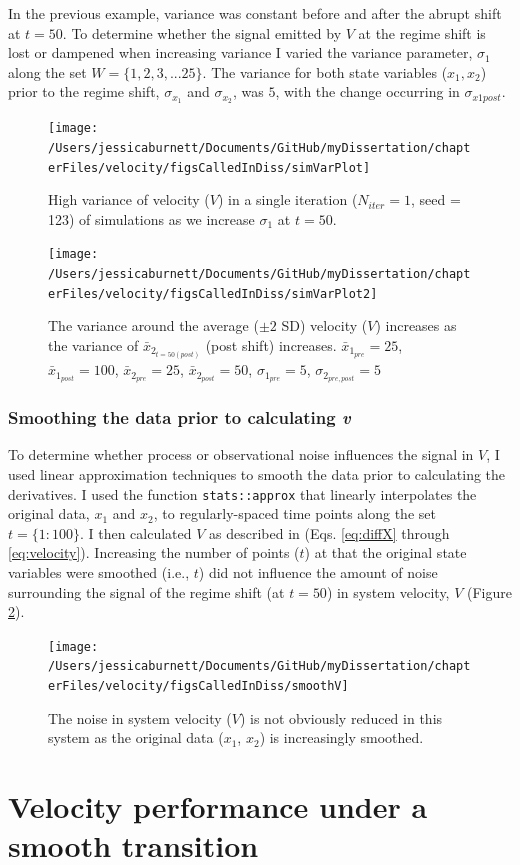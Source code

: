 \documentclass[12pt,twoside,openany]{reedthesis}
\begin{document}
In the previous example, variance was constant before and after the abrupt shift at \(t=50\). To determine whether the signal emitted by \(V\) at the regime shift is lost or dampened when increasing variance I varied the variance parameter, \(\sigma_1\) along the set \(W = \{1,2,3,...25 \}\). The variance for both state variables (\(x_1, x_2\)) prior to the regime shift, \(\sigma_{x_1}\) and \(\sigma_{x_2}\), was \(5\), with the change occurring in \(\sigma_{x1post}\).
\begin{figure}
\texttt{[image: /Users/jessicaburnett/Documents/GitHub/myDissertation/chapterFiles/velocity/figsCalledInDiss/simVarPlot]} \caption{High variance of velocity ($V$) in a single iteration ($N_{iter}=1$, seed = 123) of simulations as we increase $\sigma_1$ at $t=50$.}\label{fig:simVarPlot}
\end{figure}
\begin{figure}
\texttt{[image: /Users/jessicaburnett/Documents/GitHub/myDissertation/chapterFiles/velocity/figsCalledInDiss/simVarPlot2]} \caption{The variance around the average ($\pm2$ SD) velocity ($V$) increases as the variance of $\bar{x}_{2_{t=50 (post)}}$ (post shift) increases. $\bar{x}_{1_{pre}} = 25$, $\bar{x}_{1_{post}} = 100$, $\bar{x}_{2_{pre}} = 25$, $\bar{x}_{2_{post}} = 50$, $\sigma_{1_{pre}} = 5$, $\sigma_{2_{pre,post}} = 5$}\label{fig:simVarPlot2}
\end{figure}
\hypertarget{smoothing-the-data-prior-to-calculating-v}{%
\subsubsection{\texorpdfstring{Smoothing the data prior to calculating \emph{v}}{Smoothing the data prior to calculating v}}\label{smoothing-the-data-prior-to-calculating-v}}

To determine whether process or observational noise influences the signal in \(V\), I used linear approximation techniques to smooth the data prior to calculating the derivatives. I used the function \texttt{stats::approx} that linearly interpolates the original data, \(x_1\) and \(x_2\), to regularly-spaced time points along the set \(t=\{1:100\}\). I then calculated \(V\) as described in (Eqs. \eqref{eq:diffX} through \eqref{eq:velocity}). Increasing the number of points (\(t\)) at that the original state variables were smoothed (i.e., \(t\)) did not influence the amount of noise surrounding the signal of the regime shift (at \(t=50\)) in system velocity, \(V\) (Figure \ref{fig:simVarPlot2}).
\begin{figure}
\texttt{[image: /Users/jessicaburnett/Documents/GitHub/myDissertation/chapterFiles/velocity/figsCalledInDiss/smoothV]} \caption{The noise in system velocity ($V$) is not obviously reduced in this system as the original data ($x_1$, $x_2$) is increasingly smoothed.}\label{fig:smoothV}
\end{figure}
\hypertarget{velocity-performance-under-a-smooth-transition}{%
\section{Velocity performance under a smooth transition}\label{velocity-performance-under-a-smooth-transition}}
\end{document}
